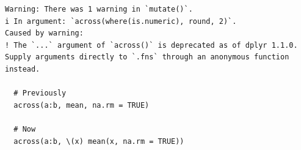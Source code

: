 \documentclass[
  letterpaper,
  DIV=11,
  numbers=noendperiod]{scrreprt}
\newenvironment{Shaded}{\begin{snugshade}}{\end{snugshade}}
\newcommand{\CommentTok}[1]{\textcolor[rgb]{0.37,0.37,0.37}{#1}}
\newcommand{\DecValTok}[1]{\textcolor[rgb]{0.68,0.00,0.00}{#1}}
\newcommand{\FunctionTok}[1]{\textcolor[rgb]{0.28,0.35,0.67}{#1}}
\newcommand{\NormalTok}[1]{\textcolor[rgb]{0.00,0.23,0.31}{#1}}
\newcommand{\SpecialCharTok}[1]{\textcolor[rgb]{0.37,0.37,0.37}{#1}}
\newcommand{\StringTok}[1]{\textcolor[rgb]{0.13,0.47,0.30}{#1}}
\begin{document}
\begin{Shaded}
\end{Shaded}

\begin{verbatim}
Warning: There was 1 warning in `mutate()`.
i In argument: `across(where(is.numeric), round, 2)`.
Caused by warning:
! The `...` argument of `across()` is deprecated as of dplyr 1.1.0.
Supply arguments directly to `.fns` through an anonymous function instead.

  # Previously
  across(a:b, mean, na.rm = TRUE)

  # Now
  across(a:b, \(x) mean(x, na.rm = TRUE))
\end{verbatim}
\end{document}
